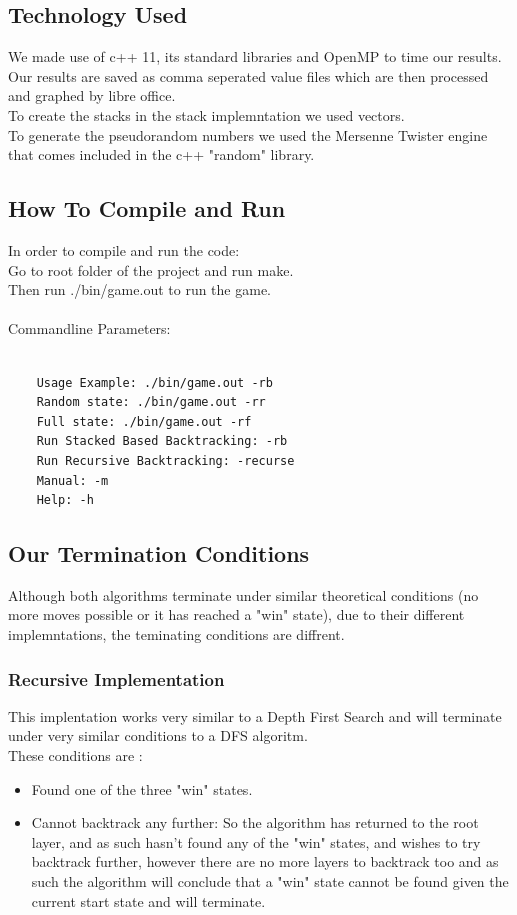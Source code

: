 \documentclass[a4paper]{article}
\begin{document}
\subsection{Technology Used}
We made use of c++ 11, its standard libraries and OpenMP to time our results. Our results are saved as comma seperated value files which are then processed and graphed by libre office.\\
To create the stacks in the stack implemntation we used vectors.\\
To generate the pseudorandom numbers we used the Mersenne Twister engine that comes included in the c++ "random" library.\\
\subsection{How To Compile and Run}
In order to compile and run the code:\\
Go to root folder of the project and run make.\\
Then run ./bin/game.out to run the game.
\\\\
\noindent Commandline Parameters:
\begin{lstlisting}
	
	Usage Example: ./bin/game.out -rb
	Random state: ./bin/game.out -rr
	Full state: ./bin/game.out -rf
	Run Stacked Based Backtracking: -rb
	Run Recursive Backtracking: -recurse
	Manual: -m
	Help: -h
\end{lstlisting}

\subsection{Our Termination Conditions}
Although both algorithms terminate under similar theoretical conditions (no more moves possible or it has reached a "win" state), due to their different implemntations, the teminating conditions are diffrent.
\subsubsection{Recursive Implementation}
This implentation works very similar to a Depth First Search and will terminate under very similar conditions to a DFS algoritm.\\
These conditions are : 
\begin{itemize}
\item Found one of the three "win" states.
\item Cannot backtrack any further: So the algorithm has returned to the root layer, and as such hasn't found any of the "win" states, and wishes to try backtrack further, however there are no more layers to backtrack too and as such the algorithm will conclude that a "win"  state cannot be found given the current start state and will terminate.
\end{itemize}
\end{document}
